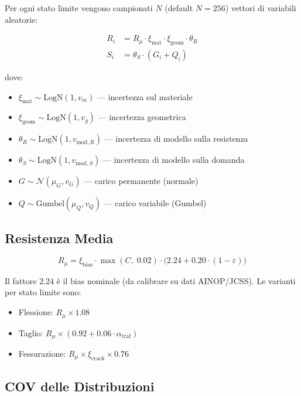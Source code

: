 \documentclass[11pt,a4paper]{article}
\begin{document}
Per ogni stato limite vengono campionati $N$ (default $N=256$) vettori di variabili aleatorie:

\begin{align}
  R_i &= R_{\mu} \cdot \xi_{\text{mat}} \cdot \xi_{\text{geom}} \cdot \theta_R \\
  S_i &= \theta_S \cdot (G_i + Q_i)
\end{align}

dove:
\begin{itemize}
  \item $\xi_{\text{mat}} \sim \text{LogN}(1, v_m)$ --- incertezza sul materiale
  \item $\xi_{\text{geom}} \sim \text{LogN}(1, v_g)$ --- incertezza geometrica
  \item $\theta_R \sim \text{LogN}(1, v_{\text{mod},R})$ --- incertezza di modello sulla resistenza
  \item $\theta_S \sim \text{LogN}(1, v_{\text{mod},S})$ --- incertezza di modello sulla domanda
  \item $G \sim \mathcal{N}(\mu_G, v_G)$ --- carico permanente (normale)
  \item $Q \sim \text{Gumbel}(\mu_Q, v_Q)$ --- carico variabile (Gumbel)
\end{itemize}

\subsection{Resistenza Media}

\begin{equation}
  R_{\mu} = \xi_{\text{bias}} \cdot \max(C,\; 0.02) \cdot \bigl(2.24 + 0.20 \cdot (1 - \varepsilon)\bigr)
\end{equation}

Il fattore $2.24$ \`e il bias nominale (da calibrare su dati AINOP/JCSS). Le varianti per stato limite sono:
\begin{itemize}
  \item Flessione: $R_{\mu} \times 1.08$
  \item Taglio: $R_{\mu} \times (0.92 + 0.06 \cdot \alpha_{\text{traf}})$
  \item Fessurazione: $R_{\mu} \times \xi_{\text{crack}} \times 0.76$
\end{itemize}

\subsection{COV delle Distribuzioni}
\end{document}
